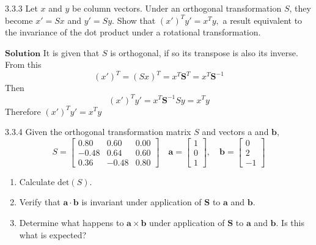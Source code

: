 \documentclass{styles/kaobook}
\begin{document}
\begin{greenbox}{3.3.3}
Let $x$ and $y$ be column vectors. Under an orthogonal transformation $S$, they become
$x'=S x$ and $y'=S y .$ Show that $\left(x'\right)^{T} y'=x^{T} y,$ a result equivalent to the invariance of the dot product under a rotational transformation.
\end{greenbox}

$\boxed{\textbf{Solution}}$ It is given that $S$ is orthogonal, if so its transpose is also its inverse.
From this
$$
\left(x'\right)^{T}=(S x)^{T}=x^{T} \mathbf{S}^{T}=x^{T} \mathbf{S}^{-1}
$$
Then
$$
\left(x'\right)^{T} y'=x^{T} \mathbf{S}^{-1} S y=x^{T} y
$$
Therefore $\left(x'\right)^{T} y'=x^{T} y$


\newpage

\begin{greenbox}{3.3.4}
Given the orthogonal transformation matrix $S$ and vectors a and $\mathbf{b}$, 
$$S=\begin{bmatrix}{0.80} & {0.60} & {0.00} \\ {-0.48} & {0.64} & {0.60} \\ {0.36} & {-0.48} & {0.80}\end{bmatrix} \quad \mathbf{a}=\begin{bmatrix}{1} \\ {0} \\ {1}\end{bmatrix}, \quad \mathbf{b}=\begin{bmatrix}{0} \\ {2} \\ {-1}\end{bmatrix}$$
\begin{enumerate}[$(a)$]
\item Calculate $\text{det}(S)$.
\item Verify that $\mathbf{a}\cdot \mathbf{b}$ is invariant under application of $\mathbf{S}$ to $\mathbf{a}$ and $\mathbf{b}$.
\item Determine what happens to $\mathbf{a}\times \mathbf{b}$ under application of $\mathbf{S}$ to $\mathbf{a}$ and $\mathbf{b}$. Is this what is expected?
\end{enumerate}
\end{greenbox}
\end{document}
